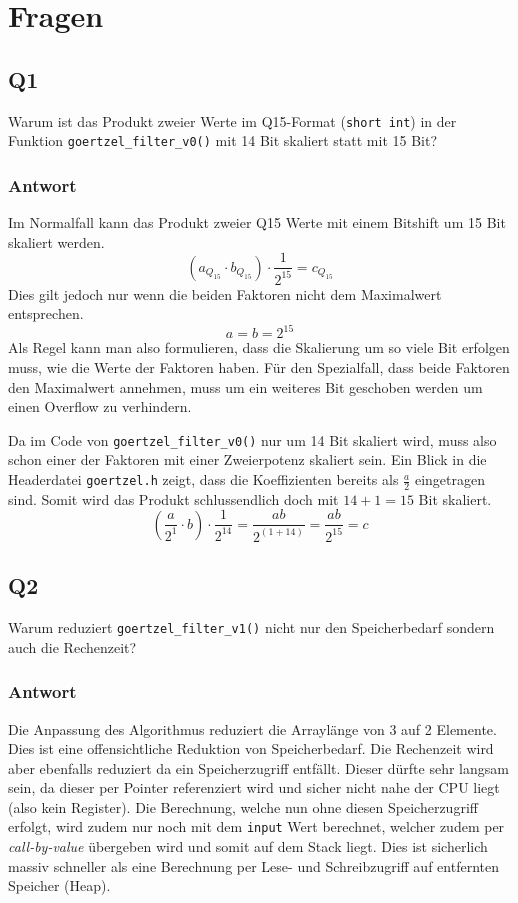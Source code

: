 \section{Fragen}

\subsection{Q1}

Warum ist das Produkt zweier Werte im Q15-Format (\lstinline{short int}) in
der Funktion \lstinline{goertzel_filter_v0()} mit 14 Bit skaliert statt mit
15 Bit?

\subsubsection*{Antwort}
Im Normalfall kann das Produkt zweier Q15 Werte mit einem Bitshift um 15 Bit
skaliert werden.
\[ 
	( a_{Q_{15}} \cdot b_{Q_{15}}) \cdot \frac{1}{2^{15}} = c_{Q_{15}}
\]
Dies gilt jedoch nur wenn die beiden Faktoren nicht dem Maximalwert
entsprechen.
\[
	a = b = 2^{15}
\]
Als Regel kann man also formulieren, dass die Skalierung um so viele Bit
erfolgen muss, wie die Werte der Faktoren haben. Für den Spezialfall, dass
beide Faktoren den Maximalwert annehmen, muss um ein weiteres Bit geschoben
werden um einen Overflow zu verhindern.

Da im Code von \lstinline{goertzel_filter_v0()} nur um 14 Bit skaliert wird,
muss also schon einer der Faktoren mit einer Zweierpotenz skaliert sein.
Ein Blick in die Headerdatei \lstinline{goertzel.h} zeigt, dass die
Koeffizienten bereits als $\frac{a}{2}$ eingetragen sind. Somit wird das
Produkt schlussendlich doch mit $14+1=15$ Bit skaliert.
\[
	\left( \frac{a}{2^1} \cdot b \right) \cdot \frac{1}{2^{14}}
	= \frac{a b}{2^{(1+14)}}
	= \frac{a b}{2^{15}}
	= c
\]

\subsection{Q2}

Warum reduziert \lstinline{goertzel_filter_v1()} nicht nur den Speicherbedarf
sondern auch die Rechenzeit?

\subsubsection*{Antwort}
Die Anpassung des Algorithmus reduziert die Arraylänge von 3 auf 2 Elemente.
Dies ist eine offensichtliche Reduktion von Speicherbedarf. Die Rechenzeit
wird aber ebenfalls reduziert da ein Speicherzugriff entfällt. Dieser dürfte
sehr langsam sein, da dieser per Pointer referenziert wird und sicher nicht
nahe der CPU liegt (also kein Register). Die Berechnung, welche nun ohne
diesen Speicherzugriff erfolgt, wird zudem nur noch mit dem \lstinline{input}
Wert berechnet, welcher zudem per \emph{call-by-value} übergeben wird und
somit auf dem Stack liegt. Dies ist sicherlich massiv schneller als eine
Berechnung per Lese- und Schreibzugriff auf entfernten Speicher (Heap).

